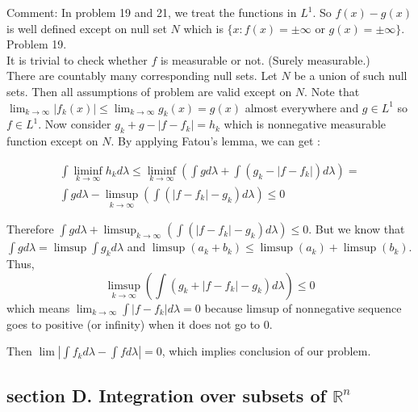 Comment: In problem 19 and 21, we treat the functions in $L^1$. So $f(x) - g(x)$ is well defined except on null set $N$ which is $\{ x: f(x) = \pm \infty \text { or } g(x) = \pm \infty \} $. \\

Problem 19. \\

It is trivial to check whether $f$ is measurable or not. (Surely measurable.)\\
There are countably many corresponding null sets. Let $N$ be a union of such null sets.
Then all assumptions of problem are valid except on $N$.
Note that $\lim_{k\rightarrow \infty} \left| f_k\left( x \right) \right | \leq \lim_{k\rightarrow \infty} g_k \left( x \right) = g(x)$ almost everywhere  and $g \in L^1$ so $f \in L^1$.
Now consider $g_k + g - \left | f - f_k  \right | = h_k $ which is nonnegative measurable function except on $N$.
By applying Fatou's lemma, we can get :

\begin{multline*}
	\int \liminf_{k \rightarrow \infty } h_k d\lambda \leq \liminf_{k\rightarrow \infty } \left( \int g d\lambda + \int \left( g_k - \left | f - f_k  \right |  \right) d\lambda  \right) = \\
	\int g d\lambda - \limsup_{k\rightarrow \infty } \left( \int \left( \left| f - f_k  \right | - g_k \right) d\lambda  \right) \leq 0
\end{multline*}

Therefore $\int g d\lambda + \limsup_{k\rightarrow \infty }\left( \int \left( \left | f- f_k \right| - g_k \right)d\lambda \right) \leq 0$. But we know that $\int g d\lambda = \limsup\int g_k d\lambda$ and $\limsup\left( a_k + b_k  \right) \leq \limsup\left( a_k  \right) + \limsup \left( b_k \right) $.
Thus, 
\begin{equation*}
	\limsup_{k\rightarrow \infty } \left(  \int \left( g_k + \left | f - f_k  \right | - g_k  \right) d\lambda  \right) \leq 0
\end{equation*}
which means $\lim_{k\rightarrow \infty } \int \left| f - f_k \right | d\lambda = 0$ because limsup of nonnegative sequence goes to positive (or infinity) when it does not go to 0.

Then $\lim \left | \int f_k d\lambda - \int f d\lambda  \right | = 0$, which implies conclusion of our problem.\\

\subsection*{section D. Integration over subsets of $\mathbb{R}^n$ } \hfill \\

